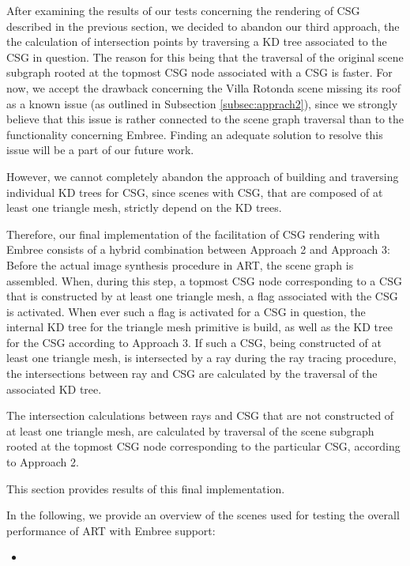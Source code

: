 After examining the results of our tests concerning the rendering of CSG described in the previous section, we decided to abandon our third approach, the the calculation of intersection points by traversing a KD tree associated to the CSG in question. The reason for this being that the traversal of the original scene subgraph rooted at the topmost CSG node associated with a CSG is faster. For now, we accept the drawback concerning the Villa Rotonda scene missing its roof as a known issue (as outlined in Subsection \ref{subsec:apprach2}), since we strongly believe that this issue is rather connected to the scene graph traversal than to the functionality concerning Embree. Finding an adequate solution to resolve this issue will be a part of our future work.

However, we cannot completely abandon the approach of building and traversing individual KD trees for CSG, since scenes with CSG, that are composed of at least one triangle mesh, strictly depend on the KD trees.

Therefore, our final implementation of the facilitation of CSG rendering with Embree consists of a hybrid combination between Approach 2 and Approach 3: Before the actual image synthesis procedure in ART, the scene graph is assembled. When, during this step, a topmost CSG node corresponding to a CSG that is constructed by at least one triangle mesh, a flag associated with the CSG is activated. When ever such a flag is activated for a CSG in question, the internal KD tree for the triangle mesh primitive is build, as well as the KD tree for the CSG according to Approach 3. If such a CSG, being constructed of at least one triangle mesh, is intersected by a ray during the ray tracing procedure, the intersections between ray and CSG are calculated by the traversal of the associated KD tree.

The intersection calculations between rays and CSG that are not constructed of at least one triangle mesh, are calculated by traversal of the scene subgraph rooted at the topmost CSG node corresponding to the particular CSG, according to Approach 2.

This section provides results of this final implementation.

\noindent In the following, we provide an overview of the scenes used for testing the overall performance of ART with Embree support:
\begin{itemize}
	\setlength\itemsep{0.05em}
	
	\item
	
	
\end{itemize}


